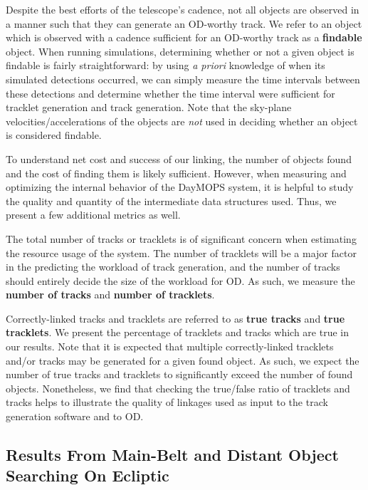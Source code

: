 \documentclass[12pt,preprint]{aastex}
\begin{document}
Despite the best efforts of the telescope's cadence, not all objects
are observed in a manner such that they can generate an OD-worthy
track.  We refer to an object which is observed with a cadence
sufficient for an OD-worthy track as a \textbf{findable} object.  When
running simulations, determining whether or not a given object is
findable is fairly straightforward: by using \textit{a priori}
knowledge of when its simulated detections occurred, we can simply
measure the time intervals between these detections and determine
whether the time interval were sufficient for tracklet generation and
track generation.  Note that the sky-plane velocities/accelerations of
the objects are \textit{not} used in deciding whether an object is
considered findable.


To understand net cost and success of our linking, the number of
objects found and the cost of finding them is likely sufficient.
However, when measuring and optimizing the internal behavior of the
DayMOPS system, it is helpful to study the quality and quantity of the
intermediate data structures used. Thus, we present a few additional
metrics as well.

The total number of tracks or tracklets is of significant concern when
estimating the resource usage of the system.  The number of tracklets
will be a major factor in the predicting the workload of track
generation, and the number of tracks should entirely decide the size
of the workload for OD.  As such, we measure the \textbf{number of
  tracks} and \textbf{number of tracklets}.  

Correctly-linked tracks and tracklets are referred to as \textbf{true
  tracks} and \textbf{true tracklets}. We present the percentage of
tracklets and tracks which are true in our results. Note that it is
expected that multiple correctly-linked tracklets and/or tracks may be
generated for a given found object. As such, we expect the number of
true tracks and tracklets to significantly exceed the number of found
objects.  Nonetheless, we find that checking the true/false ratio of
tracklets and tracks helps to illustrate the quality of linkages used
as input to the track generation software and to OD.





\subsection{Results From Main-Belt and Distant Object Searching On Ecliptic}
\end{document}
